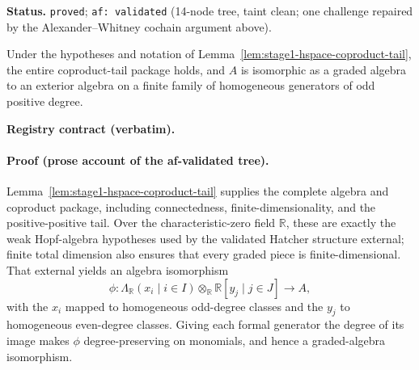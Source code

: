 \medskip
\noindent\textbf{Status.} \texttt{proved}; \texttt{af: validated} (14-node tree, taint
clean; one challenge repaired by the Alexander--Whitney cochain argument above).

\begin{lemma}\label{lem:stage1-exterior-cohomology}
Under the hypotheses and notation of Lemma~\ref{lem:stage1-hspace-coproduct-tail}, the
entire coproduct-tail package holds, and $A$ is isomorphic as a graded algebra to an
exterior algebra on a finite family of homogeneous generators of odd positive degree.
\end{lemma}

\noindent\textbf{Registry contract (verbatim).}

\paragraph{Proof (prose account of the af-validated tree).}
Lemma~\ref{lem:stage1-hspace-coproduct-tail} supplies the complete algebra and coproduct
package, including connectedness, finite-dimensionality, and the positive-positive tail.
Over the characteristic-zero field $\mathbb R$, these are exactly the weak Hopf-algebra
hypotheses used by the validated Hatcher structure external; finite total dimension also
ensures that every graded piece is finite-dimensional.  That external yields an algebra
isomorphism
\[
 \phi:\Lambda_{\mathbb R}(x_i\mid i\in I)\otimes_{\mathbb R}
       \mathbb R[y_j\mid j\in J]\longrightarrow A,
\]
with the $x_i$ mapped to homogeneous odd-degree classes and the $y_j$ to homogeneous
even-degree classes.  Giving each formal generator the degree of its image makes $\phi$
degree-preserving on monomials, and hence a graded-algebra isomorphism.


